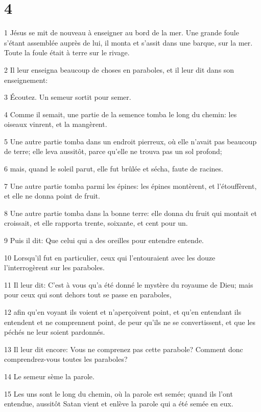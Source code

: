 \chapter{4}

\par 1 Jésus se mit de nouveau à enseigner au bord de la mer. Une grande foule s'étant assemblée auprès de lui, il monta et s'assit dans une barque, sur la mer. Toute la foule était à terre sur le rivage.
\par 2 Il leur enseigna beaucoup de choses en paraboles, et il leur dit dans son enseignement:
\par 3 Écoutez. Un semeur sortit pour semer.
\par 4 Comme il semait, une partie de la semence tomba le long du chemin: les oiseaux vinrent, et la mangèrent.
\par 5 Une autre partie tomba dans un endroit pierreux, où elle n'avait pas beaucoup de terre; elle leva aussitôt, parce qu'elle ne trouva pas un sol profond;
\par 6 mais, quand le soleil parut, elle fut brûlée et sécha, faute de racines.
\par 7 Une autre partie tomba parmi les épines: les épines montèrent, et l'étouffèrent, et elle ne donna point de fruit.
\par 8 Une autre partie tomba dans la bonne terre: elle donna du fruit qui montait et croissait, et elle rapporta trente, soixante, et cent pour un.
\par 9 Puis il dit: Que celui qui a des oreilles pour entendre entende.
\par 10 Lorsqu'il fut en particulier, ceux qui l'entouraient avec les douze l'interrogèrent sur les paraboles.
\par 11 Il leur dit: C'est à vous qu'a été donné le mystère du royaume de Dieu; mais pour ceux qui sont dehors tout se passe en paraboles,
\par 12 afin qu'en voyant ils voient et n'aperçoivent point, et qu'en entendant ils entendent et ne comprennent point, de peur qu'ils ne se convertissent, et que les péchés ne leur soient pardonnés.
\par 13 Il leur dit encore: Vous ne comprenez pas cette parabole? Comment donc comprendrez-vous toutes les paraboles?
\par 14 Le semeur sème la parole.
\par 15 Les uns sont le long du chemin, où la parole est semée; quand ils l'ont entendue, aussitôt Satan vient et enlève la parole qui a été semée en eux.
